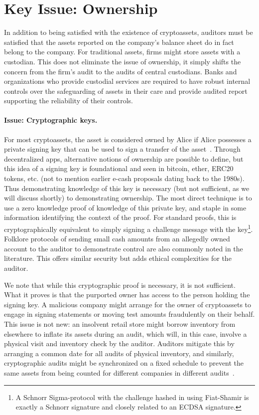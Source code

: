 
\section{Key Issue: Ownership}
In addition to being satisfied with the existence of cryptoassets, auditors must be satisfied that the assets reported on the company{'}s balance sheet do in fact belong to the company. For traditional assets, firms might store assets with a custodian. This does not eliminate the issue of ownership, it simply shifts the concern from the firm{'}s audit to the audits of central custodians. Banks and organizations who provide custodial services are required to have robust internal controls over the safeguarding of assets in their care and provide audited report supporting the reliability of their controls.

\paragraph{Issue: Cryptographic keys.} For most cryptoassets, the asset is considered owned by Alice if Alice possesses a private signing key that can be used to sign a transfer of the asset~\cite{Swi97,BFS98,KM99}. Through decentralized apps, alternative notions of ownership are possible to define, but this idea of a signing key is foundational and seen in bitcoin, ether, ERC20 tokens, etc. (not to mention earlier e-cash proposals dating back to the 1980s). Thus demonstrating knowledge of this key is necessary (but not sufficient, as we will discuss shortly) to demonstrating ownership. The most direct technique is to use a zero knowledge proof of knowledge of this private key, and staple in some information identifying the context of the proof. For standard proofs, this is cryptographically equivalent to simply signing a challenge message with the key\footnote{A Schnorr Sigma-protocol with the challenge hashed in using Fiat-Shamir is exactly a Schnorr signature and closely related to an ECDSA signature.}. Folklore protocols of sending small cash amounts from an allegedly owned account to the auditor to demonstrate control are also commonly noted in the literature. This offers similar security but adds ethical complexities for the auditor.

We note that while this cryptographic proof is necessary, it is not sufficient. What it proves is that the purported owner has access to the person holding the signing key. A malicious company might arrange for the owner of cryptoassets to engage in signing statements or moving test amounts fraudulently on their behalf. This issue is not new: an insolvent retail store might borrow inventory from elsewhere to inflate its assets during an audit, which will, in this case, involve a physical visit and inventory check by the auditor. Auditors mitigate this by arranging a common date for all audits of physical inventory, and similarly, cryptographic audits might be synchronized on a fixed schedule to prevent the same assets from being counted for different companies in different audits~\cite{dagher2015provisions}. 

